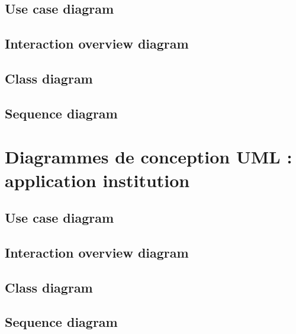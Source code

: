 \documentclass[]{report}
\begin{document}
\newpage

\subsection{Use case diagram}

\newpage

\subsection{Interaction overview diagram}

\newpage

\subsection{Class diagram}

\newpage

\subsection{Sequence diagram}

\newpage



\section{Diagrammes de conception UML : application institution}



\subsection{Use case diagram}

\newpage

\subsection{Interaction overview diagram}

\newpage

\subsection{Class diagram}

\newpage

\subsection{Sequence diagram}
\end{document}
